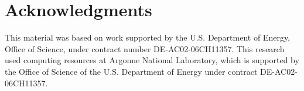 
\section*{Acknowledgments}

This material was based on work supported by the U.S. Department of Energy, Office of Science, under contract number DE-AC02-06CH11357.
This research used computing resources 
at Argonne National Laboratory, which is supported by the Office of Science 
of the U.S. Department of Energy under contract DE-AC02-06CH11357.



